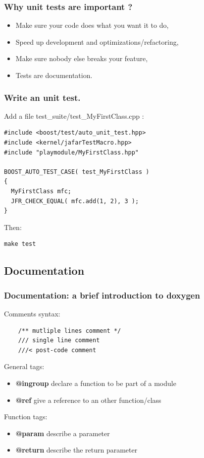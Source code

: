 \documentclass[compress]{beamer}
\begin{document}
\begin{frame}
  \frametitle{Why unit tests are important ?}
  \begin{itemize}
    \item<1-> Make sure your code does what you want it to do,
    \item<2-> Speed up development and optimizations/refactoring,
    \item<3-> Make sure nobody else breaks your feature,
    \item<4-> Tests are documentation.
  \end{itemize}
\end{frame}

\begin{frame}[fragile]
  \frametitle{Write an unit test.}
  Add a file test\_suite/test\_MyFirstClass.cpp :
  \begin{lstlisting}
#include <boost/test/auto_unit_test.hpp>
#include <kernel/jafarTestMacro.hpp>
#include "playmodule/MyFirstClass.hpp"

BOOST_AUTO_TEST_CASE( test_MyFirstClass )
{
  MyFirstClass mfc;
  JFR_CHECK_EQUAL( mfc.add(1, 2), 3 );
}
  \end{lstlisting}
  Then:
  \begin{lstlisting}
make test
  \end{lstlisting}
\end{frame}



\subsection{Documentation}


\begin{frame}[fragile]
  \frametitle{Documentation: a brief introduction to doxygen}
  Comments syntax:
  \begin{lstlisting}
	/** mutliple lines comment */
	/// single line comment
	///< post-code comment
	\end{lstlisting}
	
  General tags:
  \begin{itemize}
    \item \textbf{@ingroup} declare a function to be part of a module
    \item \textbf{@ref} give a reference to an other function/class
  \end{itemize}

  Function tags:
  \begin{itemize}
    \item \textbf{@param} describe a parameter
    \item \textbf{@return} describe the return parameter
  \end{itemize}
\end{frame}
\end{document}

